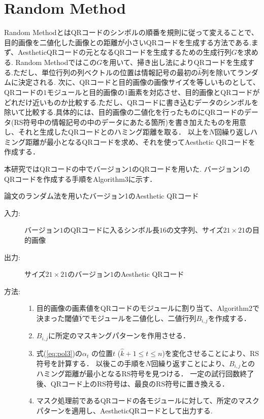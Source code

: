 \documentclass{thesis}
\begin{document}
\newpage
\section{Random Method}

Random MethodとはQRコードのシンボルの順番を規則に従って変えることで、目的画像を二値化した画像との距離が小さいQRコードを生成する方法である.まず、AestheticQRコードの元となるQRコードを生成するための生成行列$G$を求める.
Random Methodではこの$G$を用いて、掃き出し法によりQRコードを生成する.ただし、単位行列の列ベクトルの位置は情報記号の最初の$\hat{k}$列を除いてランダムに決定される.
次に、QRコードと目的画像の画像サイズを等しいものとして、QRコードの$1$モジュールと目的画像の$1$画素を対応させ、目的画像とQRコードがどれだけ近いものか比較する.ただし、QRコードに書き込むデータのシンボルを除いて比較する.具体的には、目的画像の二値化を行ったものにQRコードのデータ(RS符号中の情報記号の中のデータにあたる箇所)を書き加えたものを用意し、それと生成したQRコードとのハミング距離を取る．
以上を$N$回繰り返しハミング距離が最小となるQRコードを求め、それを使ってAesthetic QRコードを作成する．

本研究ではQRコードの中でバージョン1のQRコードを用いた.
バージョン1のQRコードを作成する手順をAlgorithm$3$に示す．

\begin{algorithm}                      
\caption{論文\cite{KURI}のランダム法を用いたバージョン1のAesthetic QRコード}         
\label{alg:alg3} 
\begin{description}
\item[入力:] バージョン$1$のQRコードに入るシンボル長$16$の文字列、サイズ$21 \times 21$の目的画像
\item[出力:] サイズ$21 \times 21$のバージョン$1$のAesthetic QRコード
\item[方法:]
\begin{enumerate}
\item
目的画像の画素値をQRコードのモジュールに割り当て、Algorithm2で決まった閾値$\overline{Y}$でモジュールを二値化し、二値行列$B_{i,j}$を作成する．
\item
$B_{i,j}$に所定のマスキングパターンを作用させる．
\item
式(\ref{eq:pol3})の$\alpha_{t}$ の位置$t$ ($\hat{k} + 1 \leq t \leq n $)を変化させることにより、RS符号を計算する．
以後この手順を$N$回繰り返すことにより、$B_{i,j}$とのハミング距離が最小となるRS符号を見つける．
一定の試行回数終了後、QRコード上のRS符号は、最良のRS符号に置き換える．
\item
マスク処理前であるQRコードの各モジュールに対して、所定のマスクパターンを適用し、AestheticQRコードとして出力する.
\end{enumerate}
\end{description}
\end{algorithm} 
\end{document}

